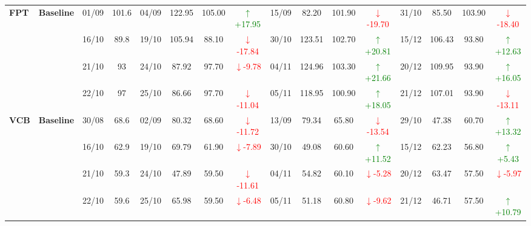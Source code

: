 \documentclass{ieeeaccess}
\begin{document}
{\begin{longtable}{llcc|cccc|cccc|cccc}
\multirow{4}{*}{\textbf{FPT}}
& \textbf{Baseline}
& 01/09 & 101.6 & 04/09 & 122.95 & 105.00 & \textcolor{green}{\(\uparrow\)+17.95} & 15/09 & 82.20 & 101.90 & \textcolor{red}{\(\downarrow\)-19.70} & 31/10 & 85.50 & 103.90 & \textcolor{red}{\(\downarrow\)-18.40} \\
& & 16/10 & 89.8 & 19/10 & 105.94 & 88.10 & \textcolor{red}{\(\downarrow\)-17.84} & 30/10 & 123.51 & 102.70 & \textcolor{green}{\(\uparrow\)+20.81} & 15/12 & 106.43 & 93.80 & \textcolor{green}{\(\uparrow\)+12.63} \\
& & 21/10 & 93 & 24/10 & 87.92 & 97.70 & \textcolor{red}{\(\downarrow\)-9.78} & 04/11 & 124.96 & 103.30 & \textcolor{green}{\(\uparrow\)+21.66} & 20/12 & 109.95 & 93.90 & \textcolor{green}{\(\uparrow\)+16.05} \\
& & 22/10 & 97 & 25/10 & 86.66 & 97.70 & \textcolor{red}{\(\downarrow\)-11.04} & 05/11 & 118.95 & 100.90 & \textcolor{green}{\(\uparrow\)+18.05} & 21/12 & 107.01 & 93.90 & \textcolor{red}{\(\downarrow\)-13.11} \\
\midrule

\multirow{4}{*}{\textbf{VCB}}
& \textbf{Baseline}
& 30/08 & 68.6 & 02/09 & 80.32 & 68.60 & \textcolor{red}{\(\downarrow\)-11.72} & 13/09 & 79.34 & 65.80 & \textcolor{red}{\(\downarrow\)-13.54} & 29/10 & 47.38 & 60.70 & \textcolor{green}{\(\uparrow\)+13.32} \\
& & 16/10 & 62.9 & 19/10 & 69.79 & 61.90 & \textcolor{red}{\(\downarrow\)-7.89} & 30/10 & 49.08 & 60.60 & \textcolor{green}{\(\uparrow\)+11.52} & 15/12 & 62.23 & 56.80 & \textcolor{green}{\(\uparrow\)+5.43} \\
& & 21/10 & 59.3 & 24/10 & 47.89 & 59.50 & \textcolor{red}{\(\downarrow\)-11.61} & 04/11 & 54.82 & 60.10 & \textcolor{red}{\(\downarrow\)-5.28} & 20/12 & 63.47 & 57.50 & \textcolor{red}{\(\downarrow\)-5.97} \\
& & 22/10 & 59.6 & 25/10 & 65.98 & 59.50 & \textcolor{red}{\(\downarrow\)-6.48} & 05/11 & 51.18 & 60.80 & \textcolor{red}{\(\downarrow\)-9.62} & 21/12 & 46.71 & 57.50 & \textcolor{green}{\(\uparrow\)+10.79} \\
\midrule


\end{longtable}}
\end{document}
